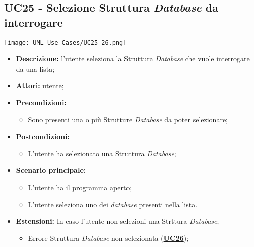 \subsection{UC25 - Selezione Struttura \textit{Database} da interrogare}
\label{sec:UC25}
\texttt{[image: UML\_Use\_Cases/UC25\_26.png]}
\begin{itemize}
	\item \textbf{Descrizione:} l’utente seleziona la Struttura \textit{Database} che vuole interrogare da una lista;
	\item \textbf{Attori:} utente;
	\item \textbf{Precondizioni:}
	\begin{itemize}
		\item Sono presenti una o più Strutture \textit{Database} da poter selezionare;
	\end{itemize}
	\item \textbf{Postcondizioni:}
	\begin{itemize}
		\item L’utente ha selezionato una Struttura \textit{Database};
	\end{itemize}
	\item \textbf{Scenario principale:}
	\begin{itemize}
		\item L’utente ha il programma aperto;
		\item L’utente seleziona uno dei \textit{database} presenti nella lista.
	\end{itemize}
	\item \textbf{Estensioni:} In caso l'utente non selezioni una Strttura \textit{Database};
	\begin{itemize}
		\item Errore Struttura \textit{Database} non selezionata (\hyperref[sec:UC26]{\textbf{UC26}});
	\end{itemize}
\end{itemize}

